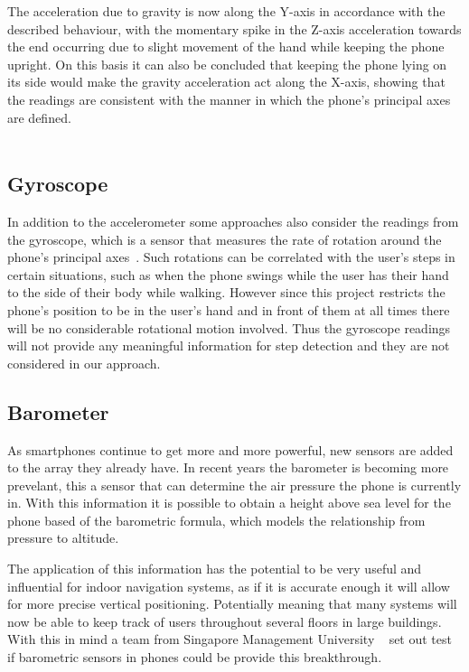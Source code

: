 \documentclass[main.tex]{subfiles}
\begin{document}
The acceleration due to gravity is now along the Y-axis in accordance with the described behaviour, with the momentary spike in the Z-axis acceleration towards the end occurring due to slight movement of the hand while keeping the phone upright. On this basis it can also be concluded that keeping the phone lying on its side would make the gravity acceleration act along the X-axis, showing that the readings are consistent with the manner in which the phone's principal axes are defined. 
\\
\\
\subsection{Gyroscope}
In addition to the accelerometer some approaches also consider the readings from the gyroscope, which is a sensor that measures the rate of rotation around the phone's principal axes~\cite{accelerometerAcceleration}. Such rotations can be correlated with the user's steps in certain situations, such as when the phone swings while the user has their hand to the side of their body while walking. However since this project restricts the phone's position to be in the user's hand and in front of them at all times there will be no considerable rotational motion involved. Thus the gyroscope readings will not provide any meaningful information for step detection and they are not considered in our approach. 

\subsection{Barometer}

As smartphones continue to get more and more powerful, new sensors are added to the array they already have. In recent years the barometer is becoming more prevelant, this a sensor that can determine the air pressure the phone is currently in. With this information it is possible to obtain a height above sea level for the phone based of the barometric formula, which models the relationship from pressure to altitude.

The application of this information has the potential to be very useful and influential for indoor navigation systems, as if it is accurate enough it will allow for more precise vertical positioning. Potentially meaning that many systems will now be able to keep track of users throughout several floors in large buildings. With this in mind a team from Singapore Management University ~\cite{baro2014} set out test if barometric sensors in phones could be provide this breakthrough.
\end{document}
